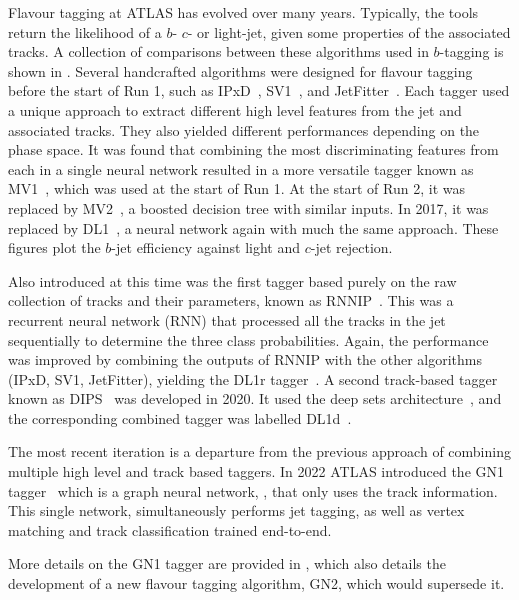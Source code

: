 Flavour tagging at ATLAS has evolved over many years.
Typically, the tools return the likelihood of a $b$- $c$- or light-jet, given some properties of the associated tracks.
A collection of comparisons between these algorithms used in $b$-tagging is shown in .
Several handcrafted algorithms were designed for flavour tagging before the start of Run 1, such as IPxD~\cite{IPxD}, SV1~\cite{SV1}, and JetFitter~\cite{JetFitter}.
Each tagger used a unique approach to extract different high level features from the jet and associated tracks.
They also yielded different performances depending on the phase space.
It was found that combining the most discriminating features from each in a single neural network resulted in a more versatile tagger known as MV1~\cite{MV1}, which was used at the start of Run 1.
At the start of Run 2, it was replaced by MV2~\cite{MV2}, a boosted decision tree with similar inputs.
In 2017, it was replaced by DL1~\cite{DL1}, a neural network again with much the same approach.
These figures plot the $b$-jet efficiency against light and $c$-jet rejection.

Also introduced at this time was the first tagger based purely on the raw collection of tracks and their parameters, known as RNNIP~\cite{RNNIP}.
This was a recurrent neural network (RNN) that processed all the tracks in the jet sequentially to determine the three class probabilities.
Again, the performance was improved by combining the outputs of RNNIP with the other algorithms (IPxD, SV1, JetFitter), yielding the DL1r tagger~\cite{Run2FTAlgs}.
A second track-based tagger known as DIPS~\cite{DIPS} was developed in 2020.
It used the deep sets architecture~\cite{DeepSets}, and the corresponding combined tagger was labelled DL1d~\cite{AlexThesis}.

The most recent iteration is a departure from the previous approach of combining multiple high level and track based taggers.
In 2022 ATLAS introduced the GN1 tagger~\cite{GN1} which is a graph neural network, , that only uses the track information.
This single network, simultaneously performs jet tagging, as well as vertex matching and track classification trained end-to-end.

More details on the GN1 tagger are provided in , which also details the development of a new flavour tagging algorithm, GN2, which would supersede it.

